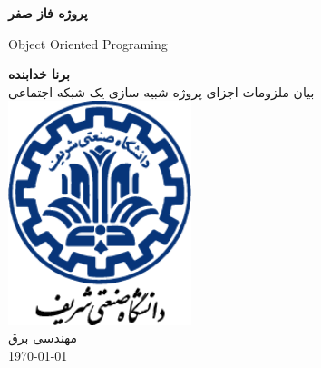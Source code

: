 \begin{titlepage}
	\begin{center}
		\vspace*{0.5cm}
        \Huge
		\textbf{پروژه فاز صفر\\}
        \LARGE
		\vspace*{0.5cm}
		\begin{latin}
			Object Oriented Programing
		\end{latin}
		\vspace*{0.5cm}
		\textbf{برنا خدابنده\\}
		\vfill
        \Large
		بیان ملزومات اجزای پروژه شبیه سازی یک شبکه اجتماعی\\
		\vspace*{0.8cm}
		\includegraphics[width = 0.4\textwidth]{62.png}\\
        مهندسی برق\\
        \vspace*{0.3cm}
        \today
	\end{center}
\end{titlepage}
